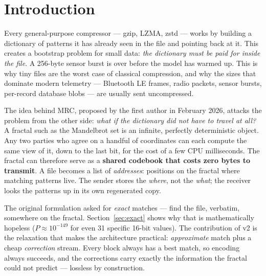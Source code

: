 \documentclass[11pt,a4paper]{article}
\begin{document}
\begin{abstract}
(zero extra bytes in frame mode), worth a further \textbf{$-2.1\,\%$ on slices
and $-6.2\,\%$ on frames, held-out}. The registry then grows by two further
routes: \emph{hunting} fixed generator families (an orbit-trap Mandelbrot
render survives a twelve-family round as ID 4) and \emph{machine-designing}
codebooks per use case (parameter search under full-encoder scoring yields
three held-out-verified recipes, IDs 5--7, including a measurable gain on
near-incompressible bearing data). We also report what does \emph{not} work:
chunking large files loses 14--39\,\%, greedy codebook blending fails out of
sample, a Hilbert-scan reordering loses $4.6\,\%$, and a 2-D tile mode loses to
the 1-D path on heightmaps. The codec is a specialist, and we map its niche
precisely.
\end{abstract}

\section{Introduction}

Every general-purpose compressor --- gzip, LZMA, zstd --- works by building a
dictionary of patterns it has already seen in the file and pointing back at it.
This creates a bootstrap problem for small data: \emph{the dictionary must be
paid for inside the file}. A 256-byte sensor burst is over before the model
has warmed up. This is why tiny files are the worst case of classical
compression, and why the sizes that dominate modern telemetry --- Bluetooth LE
frames, radio packets, sensor bursts, per-record database blobs --- are usually
sent uncompressed.

The idea behind MRC, proposed by the first author in February 2026, attacks the
problem from the other side: \emph{what if the dictionary did not have to travel
at all?} A fractal such as the Mandelbrot set is an infinite, perfectly
deterministic object. Any two parties who agree on a handful of coordinates can
each compute the same view of it, down to the last bit, for the cost of a few
CPU milliseconds. The fractal can therefore serve as a \textbf{shared codebook
that costs zero bytes to transmit}. A file becomes a list of \emph{addresses}:
positions on the fractal where matching patterns live. The sender stores the
\emph{where}, not the \emph{what}; the receiver looks the patterns up in its own
regenerated copy.

The original formulation asked for \emph{exact} matches --- find the file,
verbatim, somewhere on the fractal. Section~\ref{sec:exact} shows why that is
mathematically hopeless ($P \approx 10^{-149}$ for even 31 specific 16-bit
values). The contribution of v2 is the relaxation that makes the architecture
practical: \emph{approximate} match plus a cheap \emph{correction} stream.
Every block always has a best match, so encoding always succeeds, and the
corrections carry exactly the information the fractal could not predict ---
lossless by construction.
\end{document}
